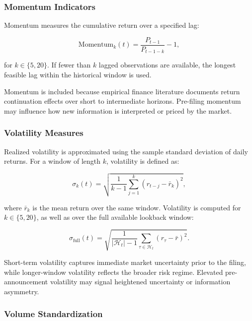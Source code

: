 \subsubsection*{Momentum Indicators}

Momentum measures the cumulative return over a specified lag:

\begin{equation}
\text{Momentum}_k(t) = \frac{P_{t-1}}{P_{t-1-k}} - 1,
\end{equation}

for $k \in \{5, 20\}$. If fewer than $k$ lagged observations are available, the longest feasible lag within the historical window is used.

Momentum is included because empirical finance literature documents return continuation effects over short to intermediate horizons. Pre-filing momentum may influence how new information is interpreted or priced by the market.

\subsubsection*{Volatility Measures}

Realized volatility is approximated using the sample standard deviation of daily returns. For a window of length $k$, volatility is defined as:

\begin{equation}
\sigma_k(t) = 
\sqrt{
\frac{1}{k-1}
\sum_{j=1}^{k}
\left(r_{t-j} - \bar{r}_k\right)^2
},
\end{equation}

where $\bar{r}_k$ is the mean return over the same window. Volatility is computed for $k \in \{5, 20\}$, as well as over the full available lookback window:

\begin{equation}
\sigma_{\text{full}}(t) =
\sqrt{
\frac{1}{|\mathcal{H}_t|-1}
\sum_{\tau \in \mathcal{H}_t}
\left(r_\tau - \bar{r}\right)^2
}.
\end{equation}

Short-term volatility captures immediate market uncertainty prior to the filing, while longer-window volatility reflects the broader risk regime. Elevated pre-announcement volatility may signal heightened uncertainty or information asymmetry.

\subsubsection*{Volume Standardization}

